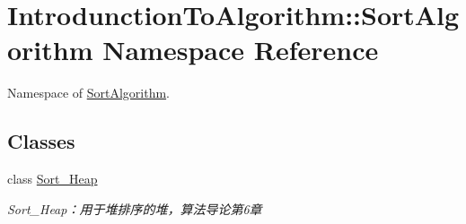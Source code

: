 \hypertarget{namespace_introdunction_to_algorithm_1_1_sort_algorithm}{}\section{Introdunction\+To\+Algorithm\+:\+:Sort\+Algorithm Namespace Reference}
\label{namespace_introdunction_to_algorithm_1_1_sort_algorithm}


Namespace of \hyperlink{namespace_introdunction_to_algorithm_1_1_sort_algorithm}{Sort\+Algorithm}.  


\subsection*{Classes}
\begin{DoxyCompactItemize}
\item 
class \hyperlink{class_introdunction_to_algorithm_1_1_sort_algorithm_1_1_sort___heap}{Sort\+\_\+\+Heap}
\begin{DoxyCompactList}\small\item\em Sort\+\_\+\+Heap：用于堆排序的堆，算法导论第6章 \end{DoxyCompactList}\end{DoxyCompactItemize}
